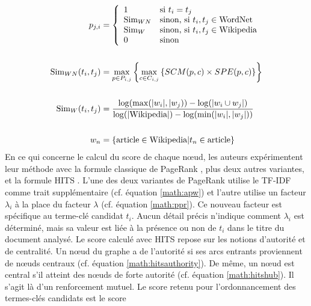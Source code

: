         \begin{align}
          p_{j, i} &= \left\{\begin{array}{ll}
            1 & \text{si $t_i = t_j$}\\
            \text{Sim}_{WN} & \text{sinon, si $t_i, t_j \in \text{WordNet}$}\\
             \text{Sim}_{W} &  \text{sinon, si $t_i, t_j \in \text{Wikipedia}$}\\
            0 & \text{sinon}
          \end{array}\right. \label{math:semanticrank}\\
          \notag\\
          \text{Sim}_{WN}(t_i, t_j) &= \max_{p \in P_{i, j}}\left\{\max_{c \in C_{i, j}}\left\{SCM(p, c) \times SPE(p, c)\right\}\right\} \label{math:wordnetsemanticrelatedness}\\
          \notag\\
          \text{Sim}_{W}(t_i, t_j) &= \frac{\log(\max(|w_i|, |w_j)) - \log(|w_i \cup w_j|)}{\log(|\text{Wikipedia}|) - \log(\min(|w_i|, |w_j|))} \label{math:wikipediasemanticrelatedness}\\
          \notag\\
          w_n &= \left\{\text{article} \in \text{Wikipedia} | t_n \in \text{article}\right\} \notag
        \end{align}
        En ce qui concerne le calcul du score de chaque n\oe{}ud, les auteurs
        expérimentent leur méthode avec la formule classique de PageRank
        \cite{brin1998pagerank}, plus deux autres variantes, et la formule
        HITS \cite{kleinberg1999hits}. L'une des deux variantes de PageRank
        utilise le TF-IDF comme trait supplémentaire (cf. équation
        \ref{math:apw}) et l'autre utilise un facteur $\lambda_i$ à la place
        du facteur $\lambda$ (cf. équation \ref{math:ppr}). Ce nouveau facteur
        est spécifique au terme-clé candidat $t_i$. Aucun détail précis
        n'indique comment $\lambda_i$ est déterminé, mais sa valeur est liée à
        la présence ou non de $t_i$ dans le titre du document analysé. Le
        score calculé avec HITS repose sur les notions d'autorité et de
        centralité. Un n\oe{}ud du graphe a de l'autorité si ses arcs entrants
        proviennent de n\oe{}uds centraux (cf. équation
        \ref{math:hitsauthority}). De même, un n\oe{}ud est central s'il
        atteint des n\oe{}uds de forte autorité (cf. équation
        \ref{math:hitshub}). Il s'agit là d'un renforcement mutuel. Le score
        retenu pour l'ordonnancement des termes-clés candidats est le score

